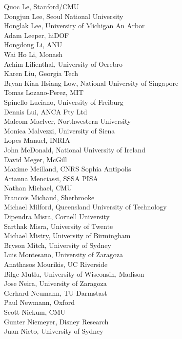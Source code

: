 \begin{multicols}{3}
{Quoc Le, Stanford/CMU\\
Dongjun Lee, Seoul National University\\
Honglak Lee, University of Michigan An Arbor\\
Adam Leeper, hiDOF\\
Hongdong Li, ANU\\
Wai Ho Li, Monash\\
Achim Lilienthal, University of Oerebro\\
Karen Liu, Georgia Tech\\
Bryan Kian Hsiang Low, National University of Singapore\\
Tomas Lozano-Perez, MIT\\
Spinello Luciano, University of Freiburg\\
Dennis Lui, ANCA Pty Ltd\\
Malcom Maclver, Northwestern University\\
Monica Malvezzi, University of Siena\\
Lopes Manuel, INRIA\\
John McDonald, National University of Ireland\\
David Meger, McGill\\
Maxime Meilland, CNRS Sophia Antipolis\\
Arianna Menciassi, SSSA PISA\\
Nathan Michael, CMU\\
Francois Michaud, Sherbrooke\\
Michael Milford, Queensland University of Technology\\
Dipendra Misra, Cornell University\\
Sarthak Misra, University of Twente\\
Michael Mistry, University of Birmingham\\
Bryson Mitch, University of Sydney\\
Luis Montesano, University of Zaragoza\\
Anathasos Mourikis, UC Riverside\\
Bilge Mutlu, University of Wisconsin, Madison\\
Jose Neira, University of Zaragoza\\
Gerhard Neumann, TU Darmstast\\
Paul Newmann, Oxford\\
Scott Niekum, CMU\\
Gunter Niemeyer, Disney Research\\
Juan Nieto, University of Sydney\\
}
\end{multicols}
